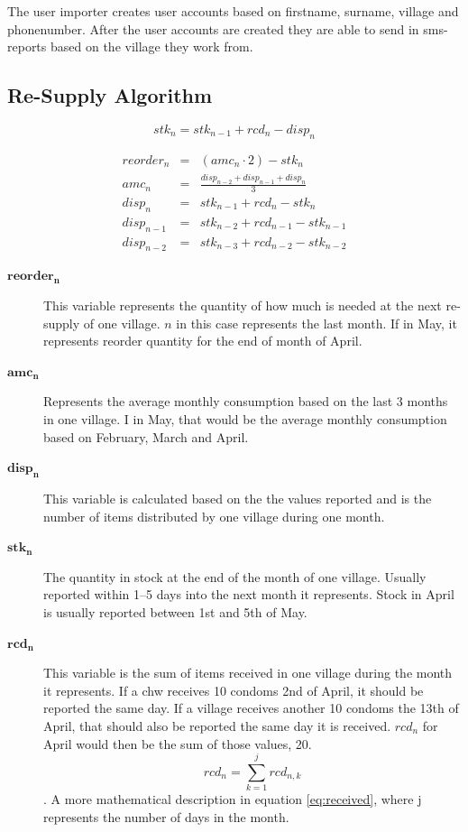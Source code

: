 The user importer creates user accounts based on firstname, surname, village and phonenumber. After the user accounts are created they are able to send in \gls{sms}-reports based on the village they work from. 

\subsection{Re-Supply Algorithm}

\begin{equation}
stk_{n} = stk_{n-1} + rcd_{n} - disp_{n}
\end{equation}

\begin{eqnarray}
reorder_{n} & = & (amc_{n} \cdot 2) - stk_{n} \\
amc_{n} & = & \frac{disp_{n-2} + disp_{n-1} + disp_{n}}{3} \\
disp_{n} & = & stk_{n-1} + rcd_{n} - stk_{n} \\
disp_{n-1} & = & stk_{n-2} + rcd_{n-1} - stk_{n-1} \\
disp_{n-2} & = & stk_{n-3} + rcd_{n-2} - stk_{n-2}
\end{eqnarray}


\begin{description}
\item[$\mathbf{reorder_{n}}$]
This variable represents the quantity of how much is needed at the next re-supply of one village. $n$ in this case represents the last month. If in May, it represents reorder quantity for the end of month of April.
\item[$\mathbf{amc_{n}}$]
Represents the average monthly consumption based on the last 3 months in one village. I in May, that would be the average monthly consumption based on February, March and April.
\item[$\mathbf{disp_{n}}$]
This variable is calculated based on the the values reported and is the number of items distributed by one village during one month.
\item[$\mathbf{stk_{n}}$]
The quantity in stock at the end of the month of one village. Usually reported within 1--5 days into the next month it represents. Stock in April is usually reported between 1st and 5th of May.
\item[$\mathbf{rcd_{n}}$]
This variable is the sum of items received in one village during the month it represents. If a \gls{chw} receives 10 condoms 2nd of April, it should be reported the same day. If a village receives another 10 condoms the 13th of April, that should also be reported the same day it is received. $rcd_{n}$ for April would then be the sum of those values, 20.
\begin{equation}
rcd_{n} = \sum_{k = 1}^{j} rcd_{n,k}
\label{eq:received}
\end{equation}.
A more mathematical description in equation \ref{eq:received}, where j represents the number of days in the month.
\end{description}

